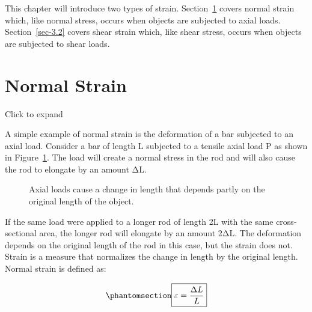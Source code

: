 \documentclass[
  letterpaper,
  DIV=11,
  numbers=noendperiod]{scrreprt}
\theoremstyle{definition}
\theoremstyle{remark}
\begin{document}
This chapter will introduce two types of strain. Section~\ref{sec-3.1}
covers normal strain which, like normal stress, occurs when objects are
subjected to axial loads. Section~\ref{sec-3.2} covers shear strain
which, like shear stress, occurs when objects are subjected to shear
loads.

\section{Normal Strain}\label{sec-3.1}

Click to expand

A simple example of normal strain is the deformation of a bar subjected
to an axial load. Consider a bar of length L subjected to a tensile
axial load P as shown in Figure~\ref{fig-3.2}. The load will create a
normal stress in the rod and will also cause the rod to elongate by an
amount ΔL.

\begin{figure}


\caption{\label{fig-3.2}Axial loads cause a change in length that
depends partly on the original length of the object.}

\end{figure}%

If the same load were applied to a longer rod of length 2L with the same
cross-sectional area, the longer rod will elongate by an amount 2ΔL. The
deformation depends on the original length of the rod in this case, but
the strain does not. Strain is a measure that normalizes the change in
length by the original length. Normal strain is defined as:

\begin{equation}\phantomsection\label{eq-3.1}{
\boxed{\varepsilon=\frac{\Delta L}{L}}
}\end{equation}
\end{document}
